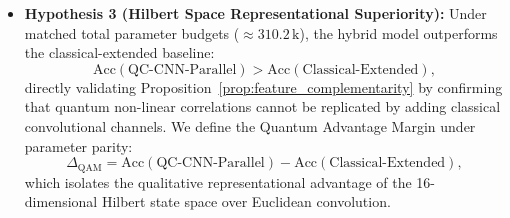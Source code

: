 \documentclass[journal]{IEEEtran}
\begin{document}
\begin{itemize}
    \item \textbf{Hypothesis 3 (Hilbert Space Representational Superiority):} Under matched total parameter budgets ($\approx 310.2\,\text{k}$), the hybrid model outperforms the classical-extended baseline:
    \begin{equation}
    \mathrm{Acc}(\text{QC-CNN-Parallel}) > \mathrm{Acc}(\text{Classical-Extended}),
    \label{eq:hyp_superiority}
    \end{equation}
    directly validating Proposition~\ref{prop:feature_complementarity} by confirming that quantum non-linear correlations cannot be replicated by adding classical convolutional channels. We define the Quantum Advantage Margin under parameter parity:
    \begin{equation}
    \Delta_{\mathrm{QAM}} = \mathrm{Acc}(\text{QC-CNN-Parallel}) - \mathrm{Acc}(\text{Classical-Extended}),
    \label{eq:qam_metric_def}
    \end{equation}
    which isolates the qualitative representational advantage of the 16-dimensional Hilbert state space over Euclidean convolution.
\end{itemize}
\end{document}
